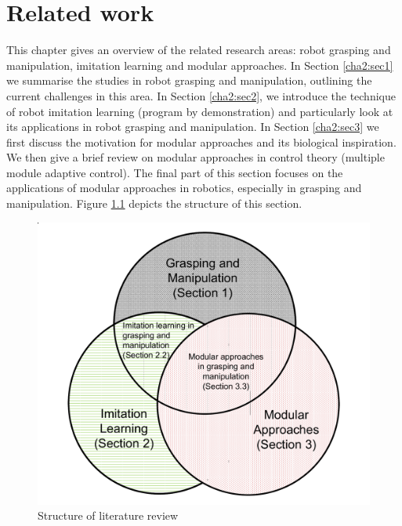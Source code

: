 \chapter{Related work}
\label{cha2}

This chapter gives an overview of the related research areas: robot grasping and manipulation, imitation learning and modular approaches. In Section \ref{cha2:sec1} we summarise the studies in robot grasping and manipulation, outlining the current challenges in this area. In Section \ref{cha2:sec2}, we introduce the technique of robot imitation learning (program by demonstration) and particularly look at its applications in robot grasping and manipulation. In Section \ref{cha2:sec3} we first discuss the motivation for modular approaches and its biological inspiration. We then give a brief review on modular approaches in control theory (multiple module adaptive control). The final part of this section focuses on the applications of modular approaches in robotics, especially in grasping and manipulation. Figure \ref{fig:litreview} depicts the structure of this section.

\begin{figure}
\centering
  \includegraphics[width=12cm]{./fig_cha2/litreview.pdf}
  \caption{Structure of literature review}
  \label{fig:litreview}
\end{figure}





%
%
%






